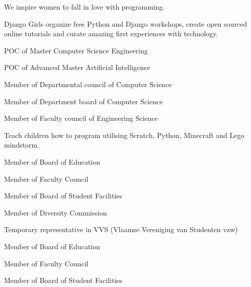 
\begin{cventries}
{\begin{cvitems}\item We inspire women to fall in love with programming.
\item Django Girls organize free Python and Django workshops, create open sourced online tutorials and curate amazing first experiences with technology.
\end{cvitems}
}

{\begin{cvitems}\item POC of Master Computer Science Engineering
\item POC of Advanced Master Artificial Intelligence
\item Member of Departmental council of Computer Science
\item Member of Department board of Computer Science
\item Member of Faculty council of Engineering Science
\end{cvitems}
}

{\begin{cvitems}\item Teach children how to program utilising Scratch, Python, Minecraft and Lego mindstorm.
\end{cvitems}
}

{\begin{cvitems}\item Member of Board of Education
\item Member of Faculty Council
\item Member of Board of Student Facilities
\item Member of Diversity Commission
\item Temporary representative in VVS (Vlaamse Vereniging van Studenten vzw)
\end{cvitems}
}

{\begin{cvitems}\item Member of Board of Education
\item Member of Faculty Council
\item Member of Board of Student Facilities
\end{cvitems}
}


\end{cventries}
